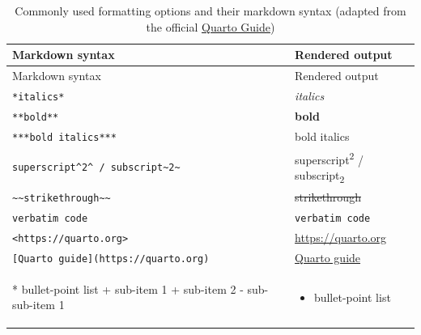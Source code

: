 \documentclass[
  letterpaper,
  DIV=11,
  numbers=noendperiod]{scrreprt}
\newenvironment{Shaded}{\begin{snugshade}}{\end{snugshade}}
\newcommand{\NormalTok}[1]{\textcolor[rgb]{0.00,0.23,0.31}{#1}}
\newcommand{\SpecialStringTok}[1]{\textcolor[rgb]{0.13,0.47,0.30}{#1}}
\begin{document}
\begin{longtable}[]{@{}
  >{\raggedright\arraybackslash}p{}
  >{\raggedright\arraybackslash}p{}@{}}
\caption{Commonly used formatting options and their markdown syntax
(adapted from the official
\href{https://quarto.org/docs/authoring/markdown-basics.html}{Quarto
Guide})}\label{tbl-markdown}\tabularnewline
\toprule\noalign{}
\begin{minipage}[b]{\linewidth}\raggedright
Markdown syntax
\end{minipage} & \begin{minipage}[b]{\linewidth}\raggedright
Rendered output
\end{minipage} \\
\midrule\noalign{}
\endfirsthead
\toprule\noalign{}
\begin{minipage}[b]{\linewidth}\raggedright
Markdown syntax
\end{minipage} & \begin{minipage}[b]{\linewidth}\raggedright
Rendered output
\end{minipage} \\
\midrule\noalign{}
\endhead
\bottomrule\noalign{}
\endlastfoot
\texttt{*italics*} & \emph{italics} \\
\texttt{**bold**} & \textbf{bold} \\
\texttt{***bold\ italics***} & bold italics \\
\texttt{superscript\^{}2\^{}\ /\ subscript\textasciitilde{}2\textasciitilde{}}
& superscript\textsuperscript{2} / subscript\textsubscript{2} \\
\texttt{\textasciitilde{}\textasciitilde{}strikethrough\textasciitilde{}\textasciitilde{}}
& \st{strikethrough} \\
\texttt{\textasciigrave{}verbatim\ code\textasciigrave{}} &
\texttt{verbatim\ code} \\
\texttt{\textless{}https://quarto.org\textgreater{}} &
\url{https://quarto.org} \\
\texttt{{[}Quarto\ guide{]}(https://quarto.org)} &
\href{https://quarto.org}{Quarto guide} \\
\begin{minipage}[t]{\linewidth}\raggedright
\begin{Shaded}
\begin{Highlighting}[]
\SpecialStringTok{* }\NormalTok{bullet{-}point list}
\SpecialStringTok{  + }\NormalTok{sub{-}item 1}
\SpecialStringTok{  + }\NormalTok{sub{-}item 2}
\SpecialStringTok{    {-} }\NormalTok{sub{-}sub{-}item 1}
\end{Highlighting}
\end{Shaded}
\end{minipage} & \begin{minipage}[t]{\linewidth}\raggedright
\begin{itemize}
\item
  bullet-point list


\end{itemize}
\end{minipage}
\end{longtable}
\end{document}
